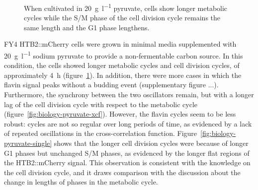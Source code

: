 \begin{figure}
  \caption{
    When cultivated in \SI{20}{\gram~\litre^{-1}} pyruvate, cells show longer metabolic cycles while the S/M phase of the cell division cycle remains the same length and the G1 phase lengthens.
  }
  \label{fig:biology-pyruvate}
\end{figure}

FY4 HTB2::mCherry cells were grown in minimal media supplemented with \SI{20}{\gram~\litre^{-1}} sodium pyruvate to provide a non-fermentable carbon source.
In this condition, the cells showed longer metabolic cycles and cell division cycles, of approximately \SI{4}{\hour} (figure~\ref{fig:biology-pyruvate}).
In addition, there were more cases in which the flavin signal peaks without a budding event (supplementary figure ...).
Furthermore, the synchrony between the two oscillators remain, but with a longer lag of the cell division cycle with respect to the metabolic cycle (figure~\ref{fig:biology-pyruvate-xcf}).
However, the flavin cycles seem to be less robust: cycles are not so regular over long periods of time, as evidenced by a lack of repeated oscillations in the cross-correlation function.
Figure~\ref{fig:biology-pyruvate-single} shows that the longer cell division cycles were because of longer G1 phases but unchanged S/M phases, as evidenced by the longer flat regions of the HTB2::mCherry signal.
This observation is consistent with the knowledge on the cell division cycle, %
and it draws comparison with the discussion about the change in lengths of phases in the metabolic cycle. %



